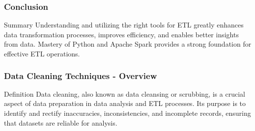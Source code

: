 \documentclass[aspectratio=169]{beamer}
\begin{document}
\begin{frame}
    \frametitle{Conclusion}
    \begin{block}{Summary}
        Understanding and utilizing the right tools for ETL greatly enhances data transformation processes, improves efficiency, and enables better insights from data. Mastery of Python and Apache Spark provides a strong foundation for effective ETL operations.
    \end{block}
\end{frame}

\begin{frame}[fragile]
    \frametitle{Data Cleaning Techniques - Overview}
    \begin{block}{Definition}
        Data cleaning, also known as data cleansing or scrubbing, is a crucial aspect of data preparation in data analysis and ETL processes. Its purpose is to identify and rectify inaccuracies, inconsistencies, and incomplete records, ensuring that datasets are reliable for analysis.
    \end{block}
\end{frame}
\end{document}
